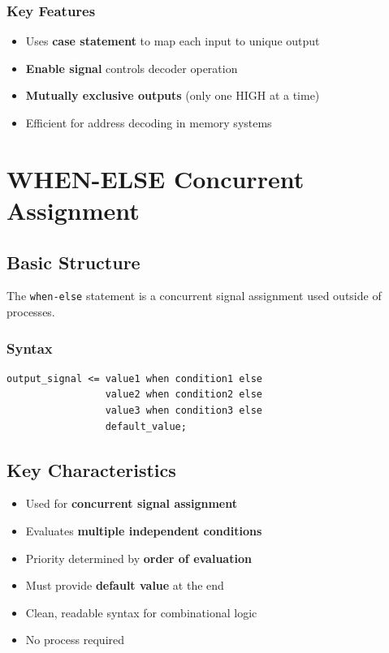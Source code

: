 \documentclass[12pt,a4paper]{article}
\begin{document}
\subsubsection{Key Features}
\begin{itemize}
    \item Uses \textbf{case statement} to map each input to unique output
    \item \textbf{Enable signal} controls decoder operation
    \item \textbf{Mutually exclusive outputs} (only one HIGH at a time)
    \item Efficient for address decoding in memory systems
\end{itemize}

\newpage
\section{WHEN-ELSE Concurrent Assignment}

\subsection{Basic Structure}

The \texttt{when-else} statement is a concurrent signal assignment used outside of processes.

\subsubsection{Syntax}
\begin{lstlisting}
output_signal <= value1 when condition1 else
                 value2 when condition2 else
                 value3 when condition3 else
                 default_value;
\end{lstlisting}

\subsection{Key Characteristics}
\begin{itemize}
    \item Used for \textbf{concurrent signal assignment}
    \item Evaluates \textbf{multiple independent conditions}
    \item Priority determined by \textbf{order of evaluation}
    \item Must provide \textbf{default value} at the end
    \item Clean, readable syntax for combinational logic
    \item No process required
\end{itemize}
\end{document}
